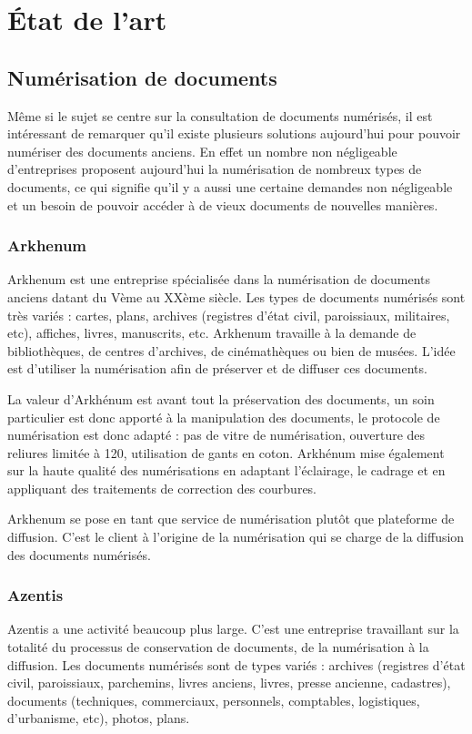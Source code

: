 \section{État de l'art}
\label{sec:etat_art}

    \subsection{Numérisation de documents}
    \label{subsec:numerisation}
    Même si le sujet se centre sur la consultation de documents numérisés, il est intéressant de remarquer qu’il existe plusieurs
    solutions aujourd’hui pour pouvoir numériser des documents anciens. En effet un nombre non négligeable d’entreprises proposent
    aujourd’hui la numérisation de nombreux types de documents, ce qui signifie qu’il y a aussi une certaine demandes non négligeable
    et un besoin de pouvoir accéder à de vieux documents de nouvelles manières.


        \subsubsection{Arkhenum}
        \label{subsubsec:arkhenum}
       Arkhenum est une entreprise spécialisée dans la numérisation de documents anciens datant du Vème au XXème siècle.
       Les types de documents numérisés sont très variés : cartes, plans, archives (registres d'état civil, paroissiaux, militaires, etc),
       affiches, livres, manuscrits, etc. Arkhenum travaille à la demande de bibliothèques, de centres d'archives, de cinémathèques
       ou bien de musées. L'idée est d'utiliser la numérisation afin de préserver et de diffuser ces documents.

        La valeur d'Arkhénum est avant tout la préservation des documents, un soin particulier est donc apporté à la manipulation
        des documents, le protocole de numérisation est donc adapté : pas de vitre de numérisation, ouverture des reliures limitée
        à 120\degree, utilisation de gants en coton. Arkhénum mise également sur la haute qualité des numérisations en adaptant l'éclairage,
        le cadrage et en appliquant des traitements de correction des courbures.

        Arkhenum se pose en tant que service de numérisation plutôt que plateforme de diffusion. C’est le client à l’origine
        de la numérisation qui se charge de la diffusion des documents numérisés.

        \subsubsection{Azentis}
        \label{subsubsec:azentis}
        Azentis a une activité beaucoup plus large. C’est une entreprise travaillant sur la totalité du processus de conservation
        de documents, de la  numérisation à la diffusion. Les documents numérisés sont de types variés : archives (registres d'état civil,
        paroissiaux, parchemins, livres anciens, livres, presse ancienne, cadastres), documents (techniques, commerciaux, personnels,
        comptables, logistiques, d'urbanisme, etc), photos, plans.


